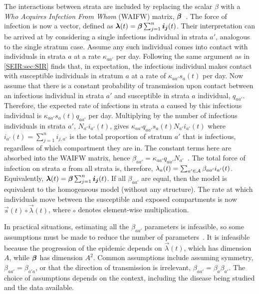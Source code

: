\documentclass[thesis.tex]{subfiles}
\begin{document}
The interactions between strata are included by replacing the scalar $\beta$ with a \emph{Who Acquires Infection From Whom} (WAIFW) matrix, $\bm{\beta}$~\autocite[58]{keelingModeling}.
The force of infection is now a vector, defined as $\bm\lambda(t) = \bm{\beta} \sum_{j=1}^n \bm{i_j}(t)$.
Their interpretation can be arrived at by considering a single infectious individual in strata $a'$, analogous to the single stratum case.
Assume any such individual comes into contact with individuals in strata $a$ at a rate $\kappa_{aa'}$ per day.
Following the same argument as in \cref{SEIR:sec:SIR} finds that, in expectation, the infectious individual makes contact with susceptible individuals in stratum $a$ at a rate of $\kappa_{aa'} s_a(t)$ per day.
Now assume that there is a constant probability of transmission upon contact between an infectious individual in strata $a'$ and susceptible in strata $a$ individual, $q_{aa'}$.
Therefore, the expected rate of infections in strata $a$ caused by this infectious individual is $\kappa_{aa'} s_a(t) q_{aa'}$ per day.
Multiplying by the number of infectious individuals in strata $a'$, $N_{a'} i_{a'}(t)$, gives $\kappa_{aa'} q_{aa'} s_a(t) N_{a'} i_{a'}(t)$ where $i_{a'}(t) = \sum_{j=1}^n i_{j,a'}$ is the total proportion of stratum $a'$ that is infectious, regardless of which compartment they are in.
The constant terms here are absorbed into the WAIFW matrix, hence $\beta_{aa'} = \kappa_{aa'} q_{aa'} N_{a'}$~\autocite[section 9.2]{diekmannMathematical}.
The total force of infection on strata $a$ from all strata is, therefore, $\lambda_a(t) = \sum_{a' \in \mathcal{A}} \beta_{aa'} i_{a'}(t)$.
Equivalently, $\bm\lambda(t) = \bm{\beta} \sum_{j=1}^n \bm{i_j}(t)$.
If all $\beta_{aa'}$ are equal, then the model is equivalent to the homogeneous model (\ie without any structure).
The rate at which individuals move between the susceptible and exposed compartments is now $\vec{s}(t) \circ \vec\lambda(t)$, where $\circ$ denotes element-wise multiplication.

In practical situations, estimating all the $\beta_{aa'}$ parameters is infeasible, so some assumptions must be made to reduce the number of parameters~\autocite[176]{andersonInfectious}.
It is infeasible because the progression of the epidemic depends on $\vec{\lambda}(t)$, which has dimension $A$, while $\bm{\beta}$ has dimension $A^2$.
Common assumptions include assuming symmetry, \ie $\beta_{aa'} = \beta_{a'a}$, or that the direction of transmission is irrelevant, \ie $\beta_{aa'} = \beta_{a} \beta_{a'}$.
The choice of assumptions depends on the context, including the disease being studied and the data available.
\end{document}
